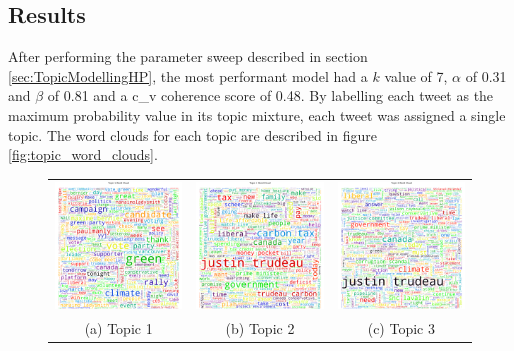 \subsection{Results}\label{sec:TopicModellingRes}

After performing the parameter sweep described in section
\ref{sec:TopicModellingHP}, the most performant model had a $k$ value of 7,
$\alpha$ of 0.31 and $\beta$ of 0.81 and a c\_v coherence score of 0.48. By
labelling each tweet as the maximum probability value in its topic mixture, each
tweet was assigned a single topic. The word clouds for each topic are described
in figure \ref{fig:topic_word_clouds}. 

\begin{singlespacing}
    \begin{figure}
        \centering
        \begin{tabular}{ccc}
        \includegraphics[width=45mm]{Figures/topic_1_wordcloud} &
        \includegraphics[width=45mm]{Figures/topic_2_wordcloud} &
        \includegraphics[width=45mm]{Figures/topic_3_wordcloud} \\
        (a) Topic 1 & (b) Topic 2 & (c) Topic 3  \\[6pt]

\end{tabular}
\end{figure}
\end{singlespacing}
